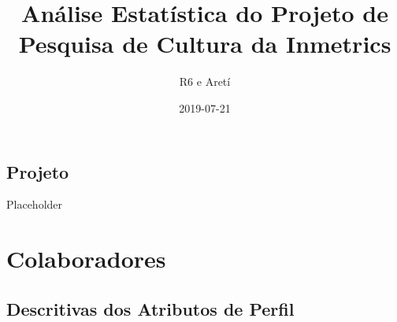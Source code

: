 \documentclass[]{book}
\title{Análise Estatística do Projeto de Pesquisa de Cultura da Inmetrics}
\author{R6 e Aretí}
\date{2019-07-21}
\begin{document}
\maketitle

{
\setcounter{tocdepth}{1}
\tableofcontents
}
\hypertarget{projeto}{%
\chapter{Projeto}\label{projeto}}

Placeholder

\hypertarget{part-colaboradores}{%
\part{Colaboradores}\label{part-colaboradores}}

\hypertarget{descritivas-dos-atributos-de-perfil}{%
\chapter{Descritivas dos Atributos de Perfil}\label{descritivas-dos-atributos-de-perfil}}
\end{document}
